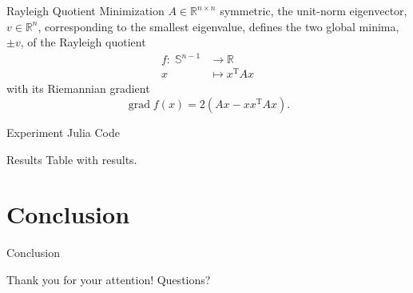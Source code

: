 \documentclass{beamer}
\begin{document}
\begin{frame}{Rayleigh Quotient Minimization}
    $A \in \mathbb{R}^{n \times n}$ symmetric, the unit-norm eigenvector, $v \in \mathbb{R}^n$, corresponding to the smallest eigenvalue, defines the two global minima, $\pm v$, of the Rayleigh quotient  
    \begin{equation*}
        \begin{split}
            f \colon \; \mathbb{S}^{n-1} & \to \mathbb{R} \\
            x & \mapsto x^{\mathrm{T}} A x 
        \end{split}
    \end{equation*}   
    with its Riemannian gradient \\[.3\baselineskip]
    \begin{equation*}
        \operatorname{grad} f(x) = 2(Ax - x x^{\mathrm{T}} A x).
    \end{equation*}
\end{frame}

\begin{frame}{Experiment}
    Julia Code
\end{frame}

\begin{frame}{Results}
    Table with results.
\end{frame}

\section{Conclusion}

\begin{frame}{Conclusion}
    
    \begin{center}
        Thank you for your attention! Questions? 
    \end{center}
\end{frame}
\end{document}
